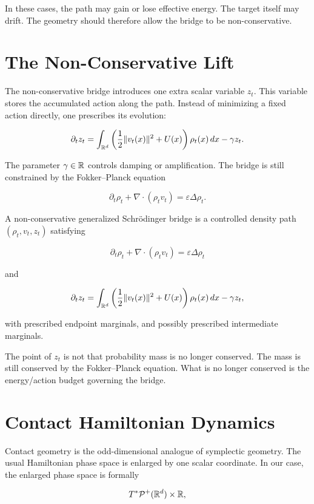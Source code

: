 In these cases, the path may gain or lose effective energy. The target itself
may drift. The geometry should therefore allow the bridge to be
non-conservative.

\section{The Non-Conservative Lift}

The non-conservative bridge introduces one extra scalar variable $z_t$. This
variable stores the accumulated action along the path. Instead of minimizing a
fixed action directly, one prescribes its evolution:

\[
\partial_t z_t
=
\int_{\mathbb{R}^d}
\left(
\frac12\|v_t(x)\|^2+U(x)
\right)
\rho_t(x)\,dx
-\gamma z_t.
\]

The parameter $\gamma\in\mathbb{R}$ controls damping or amplification. The bridge is
still constrained by the Fokker--Planck equation

\[
\partial_t\rho_t+\nabla\cdot(\rho_t v_t)
=
\varepsilon\Delta\rho_t.
\]

\begin{definition}
A non-conservative generalized Schr\"odinger bridge is a controlled density
path $(\rho_t,v_t,z_t)$ satisfying

\[
\partial_t\rho_t+\nabla\cdot(\rho_t v_t)
=
\varepsilon\Delta\rho_t
\]

and

\[
\partial_t z_t
=
\int_{\mathbb{R}^d}
\left(
\frac12\|v_t(x)\|^2+U(x)
\right)
\rho_t(x)\,dx
-\gamma z_t,
\]

with prescribed endpoint marginals, and possibly prescribed intermediate
marginals.
\end{definition}

The point of $z_t$ is not that probability mass is no longer conserved. The
mass is still conserved by the Fokker--Planck equation. What is no longer
conserved is the energy/action budget governing the bridge.

\section{Contact Hamiltonian Dynamics}

Contact geometry is the odd-dimensional analogue of symplectic geometry. The
usual Hamiltonian phase space is enlarged by one scalar coordinate. In our
case, the enlarged phase space is formally

\[
T^*\mathcal{P}^+(\mathbb{R}^d)\times\mathbb{R},
\]

